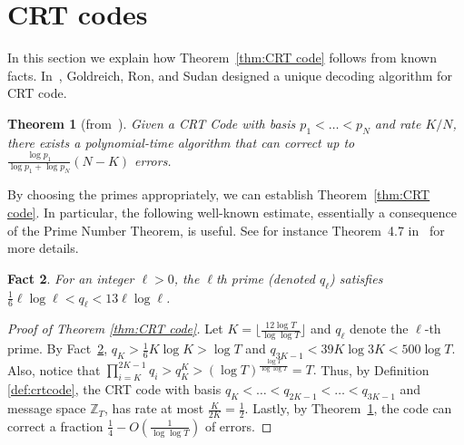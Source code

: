 \documentclass[11pt,english]{article}
\newtheorem{theorem}{Theorem}
\newtheorem{fact}[theorem]{Fact}
\theoremstyle{definition}
\theoremstyle{remark}
\newcommand{\Z}{\mathbb{Z}}
\begin{document}
\section{CRT codes\label{sec:CRT-code}}

In this section we explain how Theorem~\ref{thm:CRT code} follows from known facts.
In~\cite{grs:crt-errors}, Goldreich, Ron, and Sudan
designed a unique decoding algorithm for CRT code. 

\begin{theorem}[from~\cite{grs:crt-errors}]\label{thm:CRT decoding}
Given a CRT Code with basis $p_{1}<\ldots<p_{N}$ and rate $K/N$,
there exists a polynomial-time algorithm that can correct up to $\frac{\log p_{1}}{\log p_{1}+\log p_{N}}(N-K)$
errors. 
\end{theorem}

By choosing the primes appropriately, we can establish Theorem~\ref{thm:CRT code}.
In particular, the following well-known estimate, essentially a consequence
of the Prime Number Theorem, is useful. See for instance Theorem~4.7
in~\cite{apostol} for more details.

\begin{fact}\label{fact:Prime Number Theorem} For an integer
$\ell>0$, the $\ell$th prime (denoted $q_{\ell}$) satisfies $\frac{1}{6}\ell\log\ell<q_{\ell}<13\ell\log\ell$.
\end{fact}

\begin{proof}[Proof of Theorem \ref{thm:CRT code}] Let $K=\lfloor\frac{12\log T}{\log\log T}\rfloor$
and $q_{\ell}$ denote the $\ell$-th prime. By Fact~\ref{fact:Prime Number Theorem},
$q_{K}>\frac{1}{6}K\log K>\log T$ and $q_{3K-1}<39K\log3K<500\log T$.
Also, notice that $\prod_{i=K}^{2K-1}q_{i}>q_{K}^{K}>(\log T)^{\frac{\log T}{\log\log T}}=T.$
Thus, by Definition \ref{def:crtcode}, the CRT code with basis $q_{K}< \ldots <q_{2K-1}< \ldots < q_{3K-1}$ and message space $\Z_{T}$, has rate at most $\frac{K}{2K}=\frac{1}{2}$.
Lastly, by Theorem~\ref{thm:CRT decoding}, the code can correct a fraction
$\frac{1}{4}-O(\frac{1}{\log\log T})$ of errors.
\end{proof}
\end{document}
